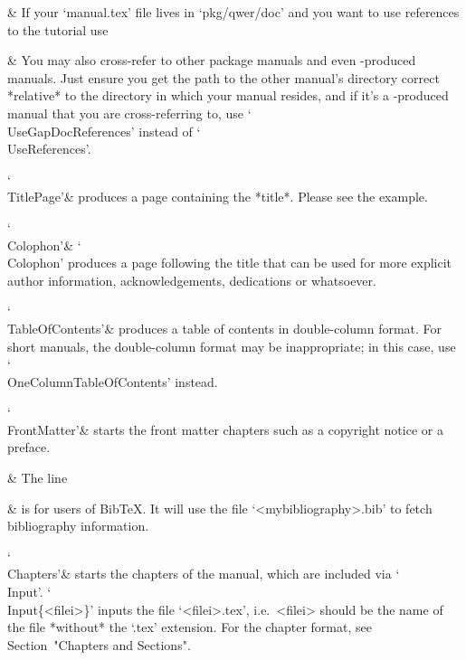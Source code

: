   &
If your `manual.tex' file lives in `pkg/qwer/doc' and  you  want  to  use
references to the tutorial use

\begintt
{}
\endtt

  &
You  may  also  cross-refer   to   other   package   manuals   and   even
-produced manuals. Just ensure you get the  path  to  the
other manual's directory correct *relative* to  the  directory  in  which
your manual resides, and if it's a -produced manual  that
you  are  cross-referring  to,  use  `\\UseGapDocReferences'  instead  of
`\\UseReferences'.

\indextt{\\TitlePage}
`\\TitlePage'&
produces a page containing the *title*. Please see the example.

\indextt{\\Colophon}
`\\Colophon'&
`\\Colophon' produces a page following the title that  can  be  used  for
more  explicit  author  information,  acknowledgements,  dedications   or
whatsoever.

\indextt{\\TableOfContents}\indextt{\\OneColumnTableOfContents}
`\\TableOfContents'&
produces a table of contents in double-column format. For short  manuals,
the  double-column  format  may  be  inappropriate;  in  this  case,  use
`\\OneColumnTableOfContents' instead.

\indextt{\\FrontMatter}
`\\FrontMatter'&
starts the front matter chapters such as a copyright notice or a preface.

  &
The line

{}

  &
is for users of Bib{\TeX}. It will use the file `<mybibliography>.bib' to
fetch bibliography information.

\indextt{\\Chapters}
`\\Chapters'&
starts the chapters of the manual,  which  are  included  via  `\\Input'.
`\\Input\{<filei>\}' inputs the file `<filei>.tex',  i.e.~<filei>  should
be the name of the file *without* the `.tex' extension. For  the  chapter
format, see Section~"Chapters and Sections".


